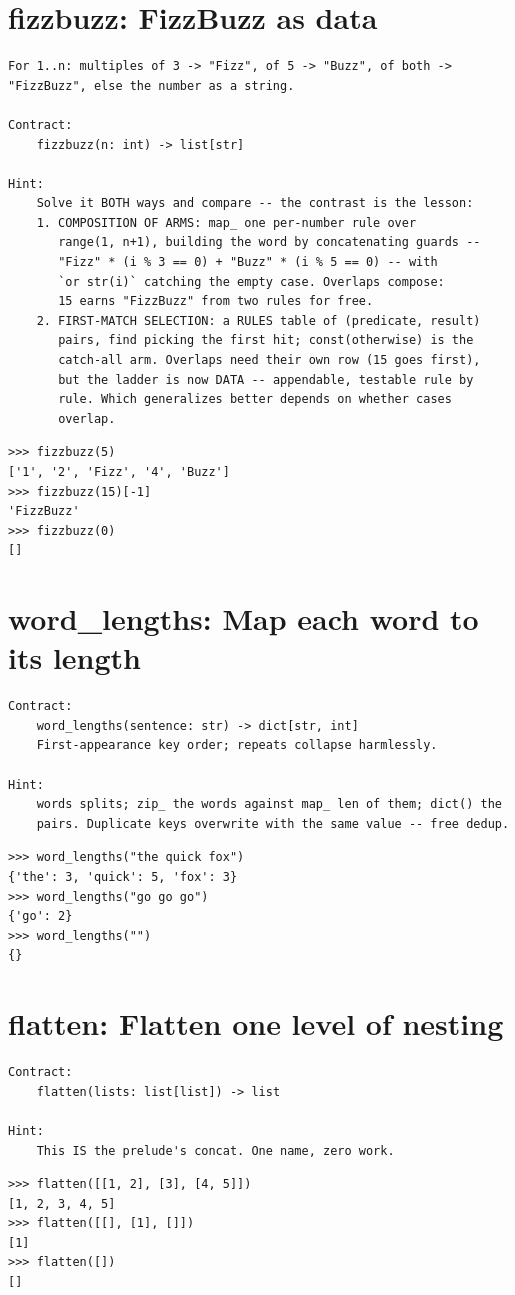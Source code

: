 \documentclass[10pt,letterpaper]{book}
\begin{document}
\section{fizzbuzz: FizzBuzz as data}
\begin{lstlisting}[style=ex]
For 1..n: multiples of 3 -> "Fizz", of 5 -> "Buzz", of both ->
"FizzBuzz", else the number as a string.

Contract:
    fizzbuzz(n: int) -> list[str]

Hint:
    Solve it BOTH ways and compare -- the contrast is the lesson:
    1. COMPOSITION OF ARMS: map_ one per-number rule over
       range(1, n+1), building the word by concatenating guards --
       "Fizz" * (i % 3 == 0) + "Buzz" * (i % 5 == 0) -- with
       `or str(i)` catching the empty case. Overlaps compose:
       15 earns "FizzBuzz" from two rules for free.
    2. FIRST-MATCH SELECTION: a RULES table of (predicate, result)
       pairs, find picking the first hit; const(otherwise) is the
       catch-all arm. Overlaps need their own row (15 goes first),
       but the ladder is now DATA -- appendable, testable rule by
       rule. Which generalizes better depends on whether cases
       overlap.
\end{lstlisting}
\begin{lstlisting}[style=ex]
>>> fizzbuzz(5)
['1', '2', 'Fizz', '4', 'Buzz']
>>> fizzbuzz(15)[-1]
'FizzBuzz'
>>> fizzbuzz(0)
[]
\end{lstlisting}

\section{word\_lengths: Map each word to its length}
\begin{lstlisting}[style=ex]
Contract:
    word_lengths(sentence: str) -> dict[str, int]
    First-appearance key order; repeats collapse harmlessly.

Hint:
    words splits; zip_ the words against map_ len of them; dict() the
    pairs. Duplicate keys overwrite with the same value -- free dedup.
\end{lstlisting}
\begin{lstlisting}[style=ex]
>>> word_lengths("the quick fox")
{'the': 3, 'quick': 5, 'fox': 3}
>>> word_lengths("go go go")
{'go': 2}
>>> word_lengths("")
{}
\end{lstlisting}

\section{flatten: Flatten one level of nesting}
\begin{lstlisting}[style=ex]
Contract:
    flatten(lists: list[list]) -> list

Hint:
    This IS the prelude's concat. One name, zero work.
\end{lstlisting}
\begin{lstlisting}[style=ex]
>>> flatten([[1, 2], [3], [4, 5]])
[1, 2, 3, 4, 5]
>>> flatten([[], [1], []])
[1]
>>> flatten([])
[]
\end{lstlisting}
\end{document}
